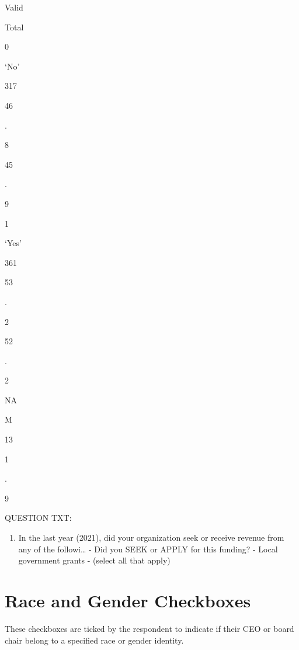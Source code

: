 \documentclass[
  letterpaper,
]{scrbook}
\providecommand{\tightlist}{%
  \setlength{\itemsep}{0pt}\setlength{\parskip}{0pt}}\usepackage{longtable,booktabs,array}
\begin{document}
Valid

Total

0

`No'

317

46

.

8

45

.

9

1

`Yes'

361

53

.

2

52

.

2

NA

M

13

1

.

9

QUESTION TXT:

\begin{enumerate}
\def\labelenumi{\arabic{enumi}.}
\setcounter{enumi}{8}
\tightlist
\item
  In the last year (2021), did your organization seek or receive revenue
  from any of the followi\ldots{} - Did you SEEK or APPLY for this
  funding? - Local government grants - (select all that apply)
\end{enumerate}

\section{Race and Gender Checkboxes}\label{race-and-gender-checkboxes}

These checkboxes are ticked by the respondent to indicate if their CEO
or board chair belong to a specified race or gender identity.
\end{document}
